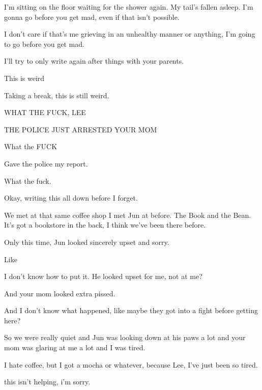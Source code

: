 { I'm sitting on the floor waiting for the shower again. My tail's fallen asleep. I'm gonna go before you get mad, even if that isn't possible.

 I don't care if that's me grieving in an unhealthy manner or anything, I'm going to go before you get mad.

 I'll try to only write again after things with your parents.

\nopagebreak

 This is weird

 Taking a break, this is still weird.

 WHAT THE FUCK, LEE

 THE POLICE JUST ARRESTED YOUR MOM

 What the FUCK

 Gave the police my report.

 What the fuck.

 Okay, writing this all down before I forget.

 We met at that same coffee shop I met Jun at before. The Book and the Bean. It's got a bookstore in the back, I think we've been there before.

 Only this time, Jun looked sincerely upset and sorry.

 Like

 I don't know how to put it. He looked upset for me, not at me?

 And your mom looked extra pissed.

 And I don't know what happened, like maybe they got into a fight before getting here?

 So we were really quiet and Jun was looking down at his paws a lot and your mom was glaring at me a lot and I was tired.

 I hate coffee, but I got a mocha or whatever, because Lee, I've just been so tired.

 this isn't helping, i'm sorry.

}
